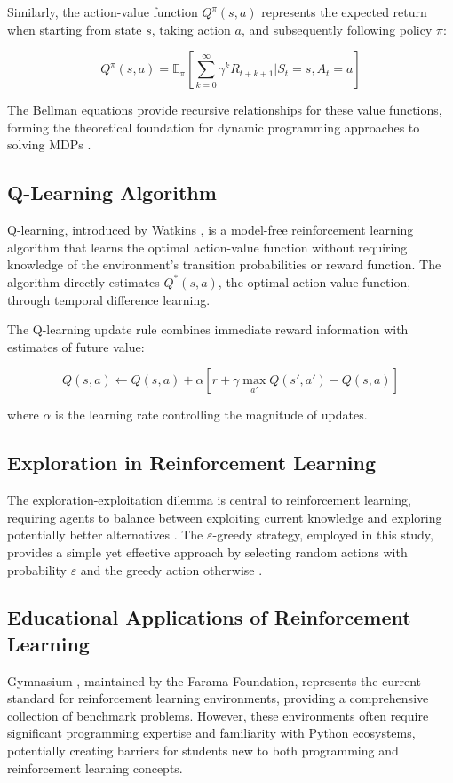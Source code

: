 Similarly, the action-value function $Q^\pi(s,a)$ represents the expected return when starting from state $s$, taking action $a$, and subsequently following policy $\pi$:

\begin{equation}
Q^\pi(s,a) = \mathbb{E}_\pi\left[\sum_{k=0}^{\infty} \gamma^k R_{t+k+1} | S_t = s, A_t = a\right]
\end{equation}

The Bellman equations provide recursive relationships for these value functions, forming the theoretical foundation for dynamic programming approaches to solving MDPs \cite{bellman1957}.

\subsection{Q-Learning Algorithm}
Q-learning, introduced by Watkins \cite{watkins1992q}, is a model-free reinforcement learning algorithm that learns the optimal action-value function without requiring knowledge of the environment's transition probabilities or reward function. The algorithm directly estimates $Q^*(s,a)$, the optimal action-value function, through temporal difference learning.

The Q-learning update rule combines immediate reward information with estimates of future value:

\begin{equation}
Q(s,a) \leftarrow Q(s,a) + \alpha \left[r + \gamma \max_{a'} Q(s',a') - Q(s,a)\right]
\end{equation}

where $\alpha$ is the learning rate controlling the magnitude of updates.

\subsection{Exploration in Reinforcement Learning}
The exploration-exploitation dilemma is central to reinforcement learning, requiring agents to balance between exploiting current knowledge and exploring potentially better alternatives \cite{thrun1992efficient}. The $\varepsilon$-greedy strategy, employed in this study, provides a simple yet effective approach by selecting random actions with probability $\varepsilon$ and the greedy action otherwise \cite{sutton2018reinforcement}.

\subsection{Educational Applications of Reinforcement Learning}

Gymnasium \cite{gymnasium2023}, maintained by the Farama Foundation, represents the current standard for reinforcement learning environments, providing a comprehensive collection of benchmark problems. However, these environments often require significant programming expertise and familiarity with Python ecosystems, potentially creating barriers for students new to both programming and reinforcement learning concepts.
